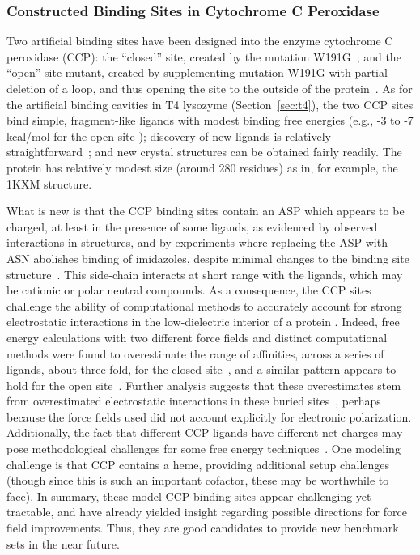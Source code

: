 \documentclass[aps,pre,twocolumn,nofootinbib,superscriptaddress,10pt, final,tightenlines]{revtex4-1}
\begin{document}
\subsubsection{Constructed Binding Sites in Cytochrome C Peroxidase}
Two artificial binding sites have been designed into the enzyme cytochrome C peroxidase (CCP): the ``closed'' site, created by the mutation W191G~\cite{fitzgerald_ligand-gated_1996, rocklin_blind_2013}; and the ``open'' site mutant, created by supplementing mutation W191G with partial deletion of a loop, and thus opening the site to the outside of the protein~\cite{musah_artificial_2002, rosenfeld_excision_2002, rocklin_blind_2013}. 
As for the artificial binding cavities in T4 lysozyme (Section~\ref{sec:t4}), the two CCP sites bind simple, fragment-like ligands with modest binding free energies (e.g., -3 to -7 kcal/mol for the open site \cite{rocklin_blind_2013}); discovery of new ligands is relatively straightforward~\cite{brenk_probing_2006, rocklin_blind_2013}; and new crystal structures can be obtained fairly readily. 
The protein has relatively modest size (around 280 residues) as in, for example, the 1KXM structure.

What is new is that the CCP binding sites contain an ASP which appears to be charged, at least in the presence of some ligands, as evidenced by observed interactions in structures, and by experiments where replacing the ASP with ASN abolishes binding of imidazoles, despite minimal changes to the binding site structure~\cite{Fitzgerald:1995:ProteinScience}. 
This side-chain interacts at short range with the ligands, which may be cationic or polar neutral compounds.
As a consequence, the CCP sites challenge the ability of computational methods to accurately account for strong electrostatic interactions in the low-dielectric interior of a protein \cite{rocklin_blind_2013}. 
Indeed, free energy calculations with two different force fields and distinct computational methods were found to overestimate the range of affinities, across a series of ligands, about three-fold, for the closed site~\cite{banba_free_2000, banba_efficient_2000}, and a similar pattern appears to hold for the open site~\cite{rocklin_blind_2013}.
Further analysis suggests that these overestimates stem from overestimated electrostatic interactions in these buried sites~\cite{rocklin_blind_2013}, perhaps because the force fields used did not account explicitly for electronic polarization.  
Additionally, the fact that different CCP ligands have different net charges may pose methodological challenges for some free energy techniques~\cite{rocklin_calculating_2013}. 
One modeling challenge is that CCP contains a heme, providing additional setup challenges (though since this is such an important cofactor, these may be worthwhile to face).
In summary, these model CCP binding sites appear challenging yet tractable, and have already yielded insight regarding possible directions for force field improvements. 
Thus, they are good candidates to provide new benchmark sets in the near future.
\end{document}

